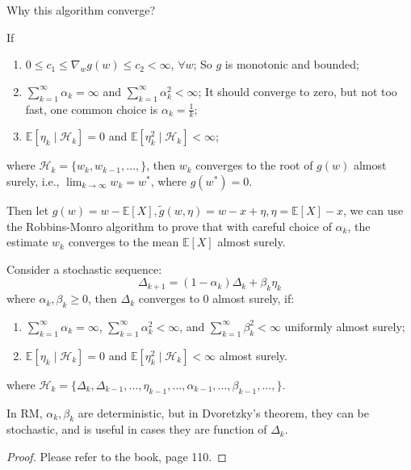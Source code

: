 \documentclass[10pt]{elegantbook}
\begin{document}
Why this algorithm converge?
\begin{theorem} \label{theorem:RM}
    If
    \begin{enumerate}
        \item $0 \leq c_1 \leq \nabla_{w}g(w) \leq c_2 < \infty$, $\forall w$; So $g$ is monotonic and bounded;
        \item $\sum_{k=1}^{\infty} \alpha_k = \infty$ and $\sum_{k=1}^{\infty} \alpha_k^2 < \infty$; It should converge to zero, but not too fast, one 
        common choice is $\alpha_k = \frac{1}{k}$;
        \item $\mathbb E[\eta_k \mid \mathcal H_k] = 0$ and $\mathbb E[\eta_k^2 \mid \mathcal H_k] < \infty$;
    \end{enumerate}
    where $\mathcal H_k = \{ w_k, w_{k-1}, \ldots, \}$, then $w_k$ converges to the root of $g(w)$ almost surely, i.e., 
    $\lim_{k \rightarrow \infty} w_k = w^*$, where $g(w^*) = 0$.
\end{theorem}

Then let $g(w) = w - \mathbb E[X], \tilde g(w, \eta) = w - x + \eta, \eta = \mathbb E[X] - x$, 
we can use the Robbins-Monro algorithm to prove that with careful choice of $\alpha_k$, the estimate $w_k$ converges to the mean $\mathbb E[X]$ almost surely.

\begin{theorem}
    Consider a stochastic sequence:
    \[ \Delta_{k+1} = (1 - \alpha_k) \Delta_k + \beta_k \eta_k \]
    where $\alpha_k, \beta_k \geq 0$, then  $\Delta_k$ converges to 0 almost surely, if:
    \begin{enumerate}
        \item $\sum_{k=1}^{\infty} \alpha_k = \infty$, $\sum_{k=1}^{\infty} \alpha_k^2 < \infty$, and $\sum_{k=1}^{\infty} \beta_k^2 < \infty$ uniformly almost surely;
        \item $\mathbb E[\eta_k \mid \mathcal H_k] = 0$ and $\mathbb E[\eta_k^2 \mid \mathcal H_k] < \infty$ almost surely.
    \end{enumerate}
    where $\mathcal H_k = \{ \Delta_k, \Delta_{k-1}, \ldots, \eta_{k-1}, \ldots, \alpha_{k-1}, \ldots, \beta_{k-1}, \ldots, \}$.
    
    In RM, $\alpha_k, \beta_k$ are deterministic, but in Dvoretzky's theorem, they can be stochastic, and is useful in cases they are function of $\Delta_k$.
\end{theorem}

\begin{proof}
    Please refer to the book, page 110.
\end{proof}
\end{document}
